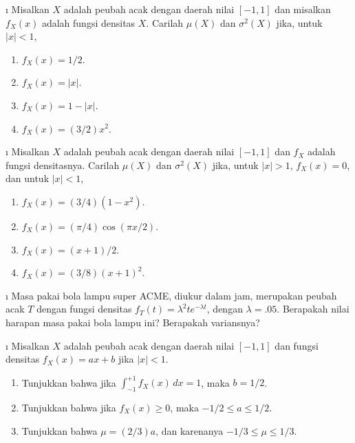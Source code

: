 {\exercises
\begin{LJSItem}

\i\label{exer 6.3.1} Misalkan $X$ adalah peubah acak dengan daerah nilai $[-1,1]$ dan
misalkan $f_X(x)$ adalah fungsi densitas $X$. Carilah $\mu(X)$ dan $\sigma^2(X)$ jika,
untuk $|x| < 1$,

\begin{enumerate}
\item $f_X(x) = 1/2$.

\item $f_X(x) = |x|$.

\item $f_X(x) = 1 - |x|$.

\item $f_X(x) = (3/2) x^2$.
\end{enumerate}


\i\label{exer 6.3.3} Misalkan $X$ adalah peubah acak dengan daerah nilai $[-1,1]$ dan
$f_X$ adalah fungsi densitasnya. Carilah $\mu(X)$ dan $\sigma^2(X)$ jika, untuk $|x| >
1$, $f_X(x) = 0$, dan untuk $|x| < 1$,

\begin{enumerate}
\item $f_X(x) = (3/4)(1 - x^2)$.

\item $f_X(x) = (\pi/4)\cos(\pi x/2)$.

\item $f_X(x) = (x + 1)/2$.

\item $f_X(x) = (3/8)(x + 1)^2$.
\end{enumerate}

\i\label{exer 6.3.5} Masa pakai bola lampu super ACME, diukur dalam jam, merupakan
peubah acak $T$ dengan fungsi densitas $f_T(t) = \lambda^2 t e^{-\lambda t}$, dengan
$\lambda = .05$. Berapakah nilai harapan masa pakai bola lampu ini? Berapakah
variansnya?

\i\label{exer 6.3.6} Misalkan $X$ adalah peubah acak dengan daerah nilai $[-1,1]$
dan fungsi densitas $f_X(x) = ax + b$ jika $|x| < 1$.

\begin{enumerate}
\item Tunjukkan bahwa jika $\int_{-1}^{+1} f_X(x)\, dx = 1$, maka $b = 1/2$.

\item Tunjukkan bahwa jika $f_X(x) \geq 0$, maka $-1/2 \leq a \leq 1/2$.

\item Tunjukkan bahwa $\mu = (2/3)a$, dan karenanya $-1/3 \leq \mu \leq 1/3$.


\end{enumerate}
\end{LJSItem}}
